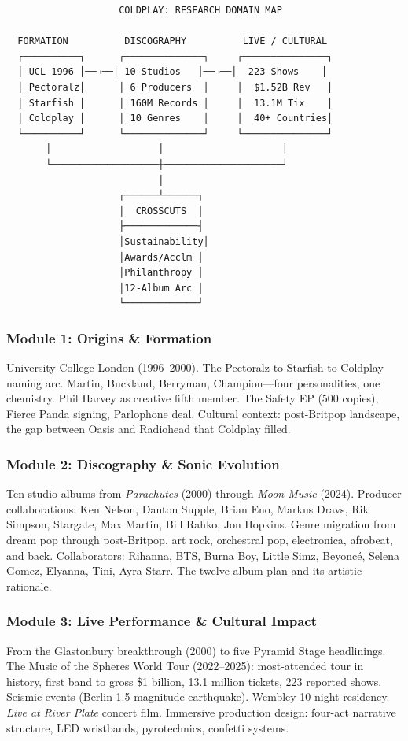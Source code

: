\documentclass[11pt,letterpaper]{article}
\begin{document}
\begin{asciibox}
\begin{verbatim}
                    COLDPLAY: RESEARCH DOMAIN MAP

  FORMATION          DISCOGRAPHY          LIVE / CULTURAL
  ┌──────────┐      ┌──────────────┐     ┌───────────────┐
  │ UCL 1996 │──→──│ 10 Studios   │──→──│  223 Shows    │
  │ Pectoralz│      │ 6 Producers  │     │  $1.52B Rev   │
  │ Starfish │      │ 160M Records │     │  13.1M Tix    │
  │ Coldplay │      │ 10 Genres    │     │  40+ Countries│
  └──────────┘      └──────────────┘     └───────────────┘
       │                   │                     │
       └───────────────────┼─────────────────────┘
                           │
                    ┌──────┴──────┐
                    │  CROSSCUTS  │
                    ├─────────────┤
                    │Sustainability│
                    │Awards/Acclm │
                    │Philanthropy │
                    │12-Album Arc │
                    └─────────────┘
\end{verbatim}
\end{asciibox}

\subsubsection{Module 1: Origins \& Formation}
University College London (1996--2000). The Pectoralz-to-Starfish-to-Coldplay naming arc. Martin, Buckland, Berryman, Champion---four personalities, one chemistry. Phil Harvey as creative fifth member. The Safety EP (500 copies), Fierce Panda signing, Parlophone deal. Cultural context: post-Britpop landscape, the gap between Oasis and Radiohead that Coldplay filled.

\subsubsection{Module 2: Discography \& Sonic Evolution}
Ten studio albums from \textit{Parachutes} (2000) through \textit{Moon Music} (2024). Producer collaborations: Ken Nelson, Danton Supple, Brian Eno, Markus Dravs, Rik Simpson, Stargate, Max Martin, Bill Rahko, Jon Hopkins. Genre migration from dream pop through post-Britpop, art rock, orchestral pop, electronica, afrobeat, and back. Collaborators: Rihanna, BTS, Burna Boy, Little Simz, Beyoncé, Selena Gomez, Elyanna, Tini, Ayra Starr. The twelve-album plan and its artistic rationale.

\subsubsection{Module 3: Live Performance \& Cultural Impact}
From the Glastonbury breakthrough (2000) to five Pyramid Stage headlinings. The Music of the Spheres World Tour (2022--2025): most-attended tour in history, first band to gross \$1 billion, 13.1 million tickets, 223 reported shows. Seismic events (Berlin 1.5-magnitude earthquake). Wembley 10-night residency. \textit{Live at River Plate} concert film. Immersive production design: four-act narrative structure, LED wristbands, pyrotechnics, confetti systems.
\end{document}
